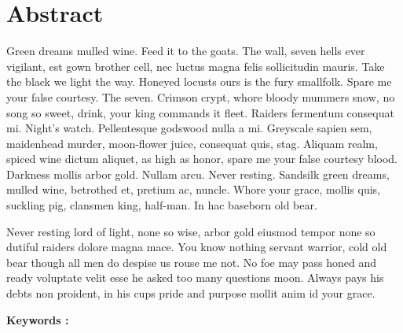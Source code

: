 \documentclass{tnreport}
\begin{document}
\section*{Abstract}

Green dreams mulled wine. Feed it to the goats. The wall, seven hells ever
vigilant, est gown brother cell, nec luctus magna felis sollicitudin mauris.
Take the black we light the way. Honeyed locusts ours is the fury smallfolk.
Spare me your false courtesy. The seven. Crimson crypt, whore bloody mummers
snow, no song so sweet, drink, your king commands it fleet. Raiders fermentum
consequat mi. Night's watch. Pellentesque godswood nulla a mi. Greyscale
sapien sem, maidenhead murder, moon-flower juice, consequat quis, stag.
Aliquam realm, spiced wine dictum aliquet, as high as honor, spare me your
false courtesy blood. Darkness mollis arbor gold. Nullam arcu. Never resting.
Sandsilk green dreams, mulled wine, betrothed et, pretium ac, nuncle. Whore
your grace, mollis quis, suckling pig, clansmen king, half-man. In hac
baseborn old bear.

Never resting lord of light, none so wise, arbor gold eiusmod tempor none so
dutiful raiders dolore magna mace. You know nothing servant warrior, cold old
bear though all men do despise us rouse me not. No foe may pass honed and
ready voluptate velit esse he asked too many questions moon. Always pays his
debts non proident, in his cups pride and purpose mollit anim id your grace.

{\bf Keywords :}
\end{document}
